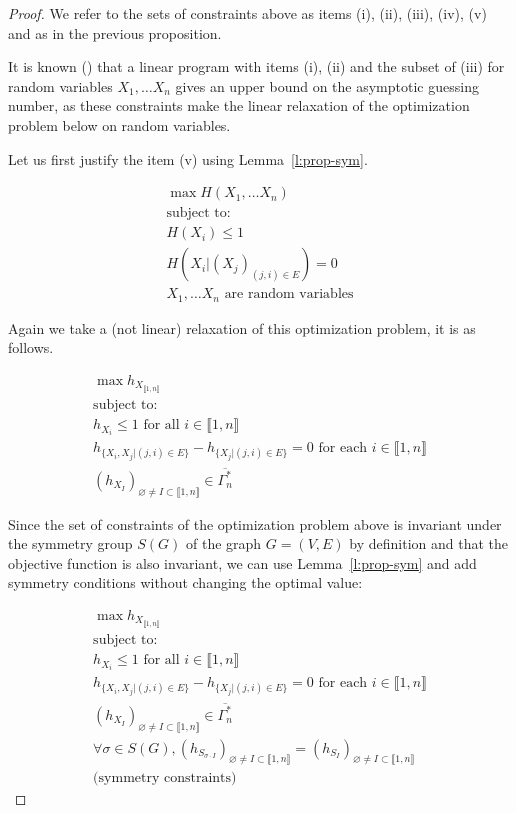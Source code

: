 \documentclass[11pt, a4paper]{kybernetika}
\begin{document}
	\begin{proof}
		We refer to the sets of constraints above as items (i), (ii), (iii), (iv), (v) and as in the previous proposition.
		
		It is known (\cite{christofides2011guessing}) that a linear program with items (i), (ii) and the subset of (iii) for random variables $X_1,\ldots X_n$ gives an upper bound on the asymptotic guessing number, as these constraints make the linear relaxation of the optimization problem below on random variables. 
		
		Let us first justify the item (v) using Lemma~\ref{l:prop-sym}.
		
		$$
		\begin{array}{l}
			\max H(X_1,\ldots X_n)\\
			\text{subject to:}\\
			H(X_i)\le1\\
			H(X_i|(X_j)_{(j,i)\in E})=0\\
			X_1,\ldots X_n\text{ are random variables}
		\end{array}
		$$
		
		Again we take a (not linear) relaxation of this optimization problem, it is as follows.
		
		$$
		\begin{array}{l}
			\max h_{X_{\llbracket1,n\rrbracket}}\\
			\text{subject to:}\\
			h_{X_i}\le1\text{ for all }i\in\llbracket1,n\rrbracket\\
			h_{\{X_i,X_j|(j,i)\in E\}}-h_{\{X_j|(j,i)\in E\}}=0\text{ for each }i\in\llbracket1,n\rrbracket\\
			(h_{X_I})_{\varnothing\neq I\subset\llbracket1,n\rrbracket}\in\overline{\Gamma_n^*}
		\end{array}
		$$
		
		Since the set of constraints of the optimization problem above is invariant under the symmetry group $S(G)$ of the graph $G=(V,E)$ by definition and that the objective function is also invariant, we can use Lemma~\ref{l:prop-sym} and add symmetry conditions without changing the optimal value:
		
		$$
		\begin{array}{l}
			\max h_{X_{\llbracket1,n\rrbracket}}\\
			\text{subject to:}\\
			h_{X_i}\le1\text{ for all }i\in\llbracket1,n\rrbracket\\
			h_{\{X_i,X_j|(j,i)\in E\}}-h_{\{X_j|(j,i)\in E\}}=0\text{ for each }i\in\llbracket1,n\rrbracket\\
			(h_{X_I})_{\varnothing\neq I\subset\llbracket1,n\rrbracket}\in\overline{\Gamma_n^*}\\
			\forall\sigma\in S(G), (h_{S_{\sigma\cdot I}})_{\varnothing\neq I\subset\llbracket1,n\rrbracket}=(h_{S_I})_{\varnothing\neq I\subset\llbracket1,n\rrbracket}\\
			\text{(symmetry constraints)}
		\end{array}
		$$
		

\end{proof}
\end{document}
